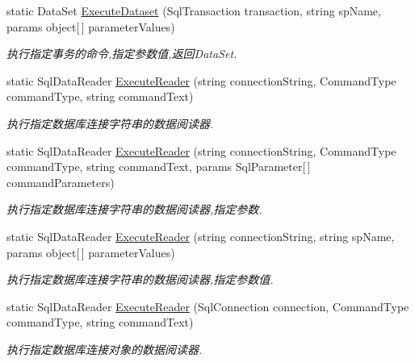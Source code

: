 \begin{DoxyCompactItemize}
static Data\-Set \hyperlink{class_x_c_l_net_tools_1_1_data_base_1_1_m_s_s_q_l_1_1_sql_helper_ab9f4eb58c69b8db635b5a53547e068fe}{Execute\-Dataset} (Sql\-Transaction transaction, string sp\-Name, params object\mbox{[}$\,$\mbox{]} parameter\-Values)
\begin{DoxyCompactList}\small\item\em 执行指定事务的命令,指定参数值,返回\-Data\-Set. \end{DoxyCompactList}\item 
static Sql\-Data\-Reader \hyperlink{class_x_c_l_net_tools_1_1_data_base_1_1_m_s_s_q_l_1_1_sql_helper_a70c403cd069bcfe3efeab17306c76a91}{Execute\-Reader} (string connection\-String, Command\-Type command\-Type, string command\-Text)
\begin{DoxyCompactList}\small\item\em 执行指定数据库连接字符串的数据阅读器. \end{DoxyCompactList}\item 
static Sql\-Data\-Reader \hyperlink{class_x_c_l_net_tools_1_1_data_base_1_1_m_s_s_q_l_1_1_sql_helper_ae47cd18e9ab625b40309a1efee21c205}{Execute\-Reader} (string connection\-String, Command\-Type command\-Type, string command\-Text, params Sql\-Parameter\mbox{[}$\,$\mbox{]} command\-Parameters)
\begin{DoxyCompactList}\small\item\em 执行指定数据库连接字符串的数据阅读器,指定参数. \end{DoxyCompactList}\item 
static Sql\-Data\-Reader \hyperlink{class_x_c_l_net_tools_1_1_data_base_1_1_m_s_s_q_l_1_1_sql_helper_a9d7dd29995996f31a09cf5e02f8e138c}{Execute\-Reader} (string connection\-String, string sp\-Name, params object\mbox{[}$\,$\mbox{]} parameter\-Values)
\begin{DoxyCompactList}\small\item\em 执行指定数据库连接字符串的数据阅读器,指定参数值. \end{DoxyCompactList}\item 
static Sql\-Data\-Reader \hyperlink{class_x_c_l_net_tools_1_1_data_base_1_1_m_s_s_q_l_1_1_sql_helper_adb1afcb435b963bf4848bc42cda3a458}{Execute\-Reader} (Sql\-Connection connection, Command\-Type command\-Type, string command\-Text)
\begin{DoxyCompactList}\small\item\em 执行指定数据库连接对象的数据阅读器. \end{DoxyCompactList}\item 

\end{DoxyCompactItemize}
